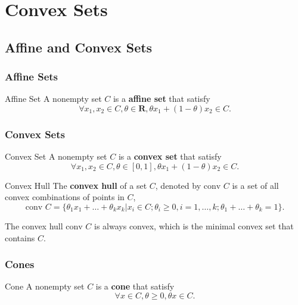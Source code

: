\chapter{Convex Sets}

\section{Affine and Convex Sets}

\subsection{Affine Sets}

\begin{definition}{Affine Set}{}
    A nonempty set $C$ is a \textbf{affine set} that satisfy $$\forall x_1,x_2\in C, \theta\in\mathbf{R}, \theta x_1+(1-\theta)x_2\in C.$$
\end{definition}

\subsection{Convex Sets}

\begin{definition}{Convex Set}{}
    A nonempty set $C$ is a \textbf{convex set} that satisfy $$\forall x_1,x_2\in C,\theta\in[0,1], \theta x_1+(1-\theta)x_2\in C.$$
\end{definition}

\begin{definition}{Convex Hull}{}
    The \textbf{convex hull} of a set $C$, denoted by $\text{conv } C$ is a set of all convex combinations of points in $C$, $$\text{conv } C=\{\theta_1x_1+\ldots+\theta_kx_k|x_i\in C;\theta_i\geq 0,i=1,\ldots,k;\theta_1+\ldots+\theta_k=1\}.$$
\end{definition}

\begin{note}
    The convex hull $\text{conv } C$ is always convex, which is the minimal convex set that contains $C$.
\end{note}

\subsection{Cones}

\begin{definition}{Cone}{}
    A nonempty set $C$ is a \textbf{cone} that satisfy $$\forall x\in C,\theta\geq 0,\theta x\in C.$$
\end{definition}

